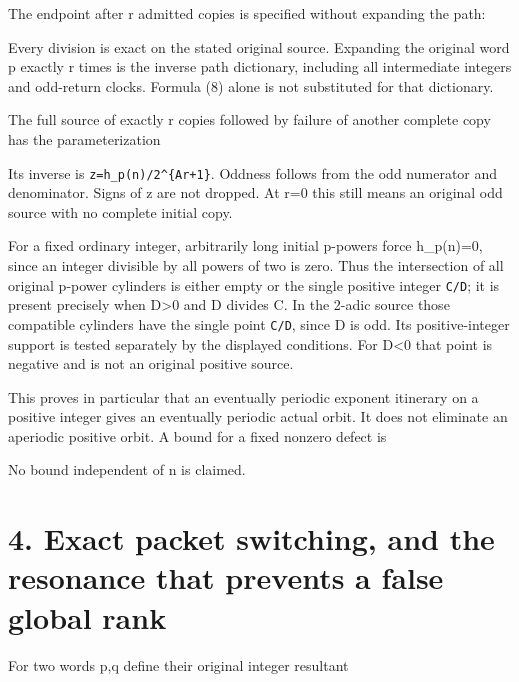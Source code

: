The endpoint after r admitted copies is specified without expanding the
path:


Every division is exact on the stated original source. Expanding the
original word p exactly r times is the inverse path dictionary,
including all intermediate integers and odd-return clocks. Formula (8)
alone is not substituted for that dictionary.

The full source of exactly r copies followed by failure of another
complete copy has the parameterization


Its inverse is \texttt{z=h\_p(n)/2\^{}\{Ar+1\}}. Oddness follows from
the odd numerator and denominator. Signs of z are not dropped. At r=0
this still means an original odd source with no complete initial copy.

For a fixed ordinary integer, arbitrarily long initial p-powers force
h\_p(n)=0, since an integer divisible by all powers of two is zero. Thus
the intersection of all original p-power cylinders is either empty or
the single positive integer \nolinkurl{C/D}; it is present precisely
when D\textgreater0 and D divides C. In the 2-adic source those
compatible cylinders have the single point \nolinkurl{C/D}, since D is
odd. Its positive-integer support is tested separately by the displayed
conditions. For D\textless0 that point is negative and is not an
original positive source.

This proves in particular that an eventually periodic exponent itinerary
on a positive integer gives an eventually periodic actual orbit. It does
not eliminate an aperiodic positive orbit. A bound for a fixed nonzero
defect is


No bound independent of n is claimed.

\section{4. Exact packet switching, and the resonance that prevents a
false global rank}

For two words p,q define their original integer resultant


